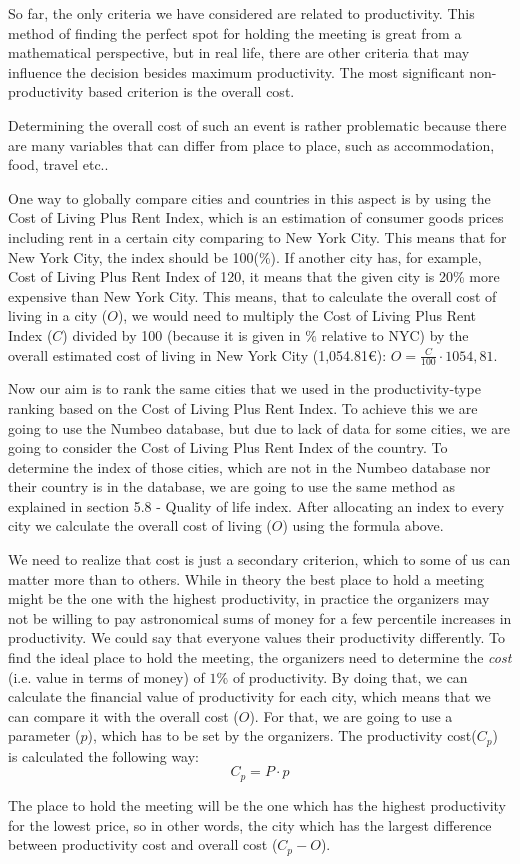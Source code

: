 
So far, the only criteria we have considered are related to productivity. This method of finding the perfect spot for holding the meeting is great from a mathematical perspective, but in real life, there are other criteria that may influence the decision besides maximum productivity. The most significant non-productivity based criterion is the overall cost.

Determining the overall cost of such an event is rather problematic because there are many variables that can differ from place to place, such as accommodation, food, travel etc..

One way to globally compare cities and countries in this aspect is by using the Cost of Living Plus Rent Index, which is an estimation of consumer goods prices including rent in a certain city comparing to New York City. This means that for New York City, the index should be 100(\%). If another city has, for example, Cost of Living Plus Rent Index of 120, it means that the given city is 20\% more expensive than New York City. This means, that to calculate the overall cost of living in a city ($O$), we would need to multiply the Cost of Living Plus Rent Index ($C$) divided by 100 (because it is given in $\%$ relative to NYC) by the overall estimated cost of living in New York City (1,054.81€): $O=\frac{C}{100}\cdot 1054,81$.
 
Now our aim is to rank the same cities that we used in the productivity-type ranking based on the Cost of Living Plus Rent Index. To achieve this we are going to use the Numbeo database, but due to lack of data for some cities, we are going to consider the Cost of Living Plus Rent Index of the country. To determine the index of those cities, which are not in the Numbeo database nor their country is in the database, we are going to use the same method as explained in section 5.8 - Quality of life index. After allocating an index to every city we calculate the overall cost of living ($O$) using the formula above. 

We need to realize that cost is just a secondary criterion, which to some of us can matter more than to others. While in theory the best place to hold a meeting might be the one with the highest productivity, in practice the organizers may not be willing to pay astronomical sums of money for a few percentile increases in productivity. We could say that everyone values their productivity differently. To find the ideal place to hold the meeting, the organizers need to determine the \emph{cost} (i.e. value in terms of money) of $1\%$ of productivity. By doing that, we can calculate the financial value of productivity for each city, which means that we can compare it with the overall cost ($O$). For that, we are going to use a parameter ($p$), which has to be set by the organizers. The productivity cost($C_p$) is calculated  the following way:
$$C_p=P\cdot p$$

The place to hold the meeting will be the one which has the highest productivity for the lowest price, so in other words, the city which has the largest difference between productivity cost and overall cost ($C_p-O$).

